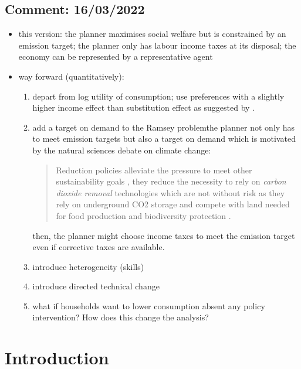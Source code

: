 
\subsection*{Comment: 16/03/2022}
\begin{itemize}
	\item this version: the planner maximises social welfare but is constrained by an emission target; the planner only has labour income taxes at its disposal; the economy can be represented by a representative agent
	\item way forward (quantitatively):
	\begin{enumerate}
			\item depart from log utility of consumption; use preferences with a slightly higher income effect than substitution effect as suggested by \cite{Boppart2019LaborPerspectiveb}.
		\item  add a target on demand to the Ramsey problem\ar the planner not only has to meet emission targets but also a target on demand which is motivated by the natural sciences debate on climate change: 
		\begin{quote}Reduction policies alleviate the pressure to meet other sustainability goals \citep{Bertram2018TargetedScenarios}, they reduce the necessity to rely on \textit{carbon dioxide removal} technologies which are not without risk as they rely on  underground CO2 storage and compete with land needed for food production and biodiversity protection \citep{VanVuuren2018AlternativeTechnologies}.
		\end{quote}
	then, the planner might choose income taxes to meet the emission target even if corrective taxes are available.

		\item  introduce heterogeneity  (skills) 
		\item  introduce directed technical change 
		\item what if households want to lower consumption absent any policy intervention? How does this change the analysis?
	\end{enumerate}
	
\end{itemize}

\section{Introduction}

